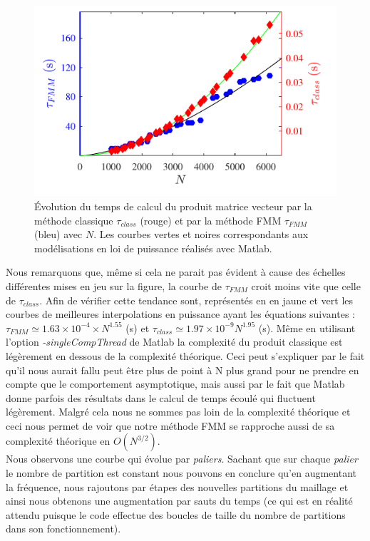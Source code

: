 \documentclass[10pt]{article}
\begin{document}
\begin{multicols}{2}
\begin{figure}[H]
  \begin{center}
  \includegraphics[width=0.95\columnwidth]{Q7.pdf}
  \vspace*{-11pt}
  \caption{Évolution du temps de calcul du produit matrice vecteur par la méthode classique $\tau_{class}$ (rouge) et par la méthode FMM $\tau_{FMM}$ (bleu) avec $N$. Les courbes vertes et noires correspondants aux modélisations en loi de puissance réalisés avec Matlab.}
  \label{fig:Q7}
  \end{center}
\end{figure}
\vspace*{-22pt}

Nous remarquons que, même si cela ne parait pas évident à cause des échelles différentes mises en jeu sur la figure, la courbe de $\tau_{FMM}$ croit moins vite que celle de $\tau_{class}$. Afin de vérifier cette tendance sont, représentés en en jaune et vert les courbes de meilleures interpolations en puissance ayant les équations suivantes : $\tau_{FMM} \simeq 1.63\times10^{-4} \times N^{1.55}$ (s) et $\tau_{class} \simeq 1.97\times10^{-9}  N^{1.95}$ (s). Même en utilisant l'option \textit{-singleCompThread} de Matlab la complexité du produit classique est légèrement en dessous de la complexité théorique. Ceci peut s'expliquer par le fait qu'il nous aurait fallu peut être plus de point à N plus grand pour ne prendre en compte que le comportement asymptotique, mais aussi par le fait que Matlab donne parfois des résultats dans le calcul de temps écoulé qui fluctuent légèrement. Malgré cela nous ne sommes pas loin de la complexité théorique et ceci nous permet de voir que notre méthode FMM se rapproche aussi de sa complexité théorique en $O(N^{3/2})$. \\
\indent
Nous observons une courbe qui évolue par \textit{paliers}. Sachant que sur chaque \textit{palier} le nombre de partition est constant nous pouvons en conclure qu'en augmentant la fréquence, nous rajoutons par étapes des nouvelles partitions du maillage et ainsi nous obtenons une augmentation par sauts du temps (ce qui est en réalité attendu puisque le code effectue des boucles de taille du nombre de partitions dans son fonctionnement).\\


\end{multicols}
\end{document}
